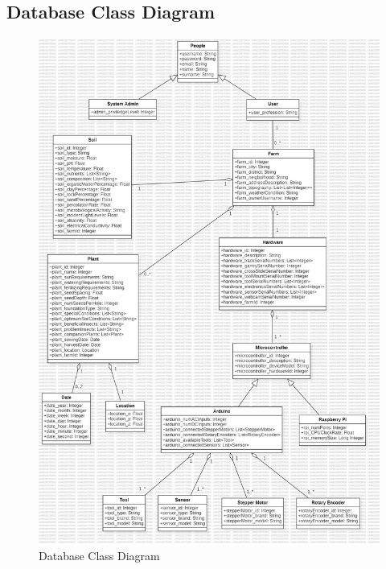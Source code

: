 \newpage
\subsection{Database Class Diagram}
\begin{figure}[htbp]
    \centering
    \includegraphics[width=0.7\linewidth]{Figures/database_class_diagram.jpg}
    \caption{Database Class Diagram}
    \label{Database}
\end{figure}
\newpage


